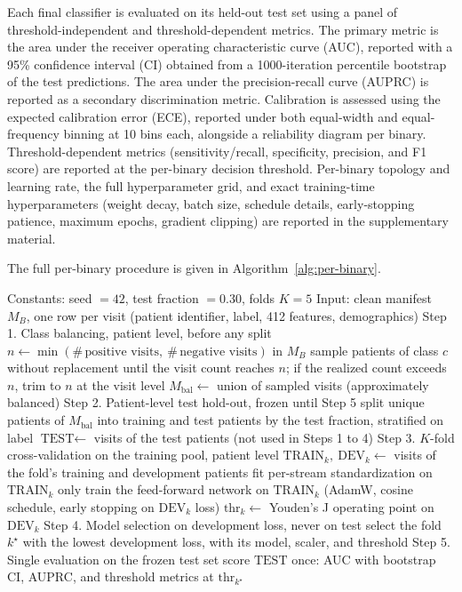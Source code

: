 \documentclass[utf8]{FrontiersinHarvard} %
\begin{document}
Each final classifier is evaluated on its held-out test set using a panel of threshold-independent and threshold-dependent metrics. The primary metric is the area under the receiver operating characteristic curve (AUC), reported with a 95\% confidence interval (CI) obtained from a 1000-iteration percentile bootstrap of the test predictions. The area under the precision-recall curve (AUPRC) is reported as a secondary discrimination metric. Calibration is assessed using the expected calibration error (ECE), reported under both equal-width and equal-frequency binning at 10 bins each, alongside a reliability diagram per binary. Threshold-dependent metrics (sensitivity/recall, specificity, precision, and F1 score) are reported at the per-binary decision threshold. Per-binary topology and learning rate, the full hyperparameter grid, and exact training-time hyperparameters (weight decay, batch size, schedule details, early-stopping patience, maximum epochs, gradient clipping) are reported in the supplementary material.

The full per-binary procedure is given in Algorithm~\ref{alg:per-binary}.

\begin{algorithm}[htbp]
\caption{Per-binary preparation, training, and evaluation (binary $B$).}
\label{alg:per-binary}
\begin{algorithmic}[1]
\State Constants: seed $=42$, test fraction $=0.30$, folds $K=5$
\State Input: clean manifest $M_B$, one row per visit (patient identifier, label, 412 features, demographics)
\Statex
\State Step 1. Class balancing, patient level, before any split
\State $n \gets \min(\#\,\text{positive visits},\ \#\,\text{negative visits})$ in $M_B$
  \State sample patients of class $c$ without replacement until the visit count reaches $n$; if the realized count exceeds $n$, trim to $n$ at the visit level
\EndFor
\State $M_{\text{bal}} \gets$ union of sampled visits (approximately balanced)
\Statex
\State Step 2. Patient-level test hold-out, frozen until Step 5
\State split unique patients of $M_{\text{bal}}$ into training and test patients by the test fraction, stratified on label
\State $\text{TEST} \gets$ visits of the test patients (not used in Steps 1 to 4)
\Statex
\State Step 3. $K$-fold cross-validation on the training pool, patient level
  \State $\text{TRAIN}_k,\ \text{DEV}_k \gets$ visits of the fold's training and development patients
  \State fit per-stream standardization on $\text{TRAIN}_k$ only
  \State train the feed-forward network on $\text{TRAIN}_k$ (AdamW, cosine schedule, early stopping on $\text{DEV}_k$ loss)
  \State $\text{thr}_k \gets$ Youden's J operating point on $\text{DEV}_k$
\EndFor
\Statex
\State Step 4. Model selection on development loss, never on test
\State select the fold $k^\star$ with the lowest development loss, with its model, scaler, and threshold
\Statex
\State Step 5. Single evaluation on the frozen test set
\State score $\text{TEST}$ once: AUC with bootstrap CI, AUPRC, and threshold metrics at $\text{thr}_{k^\star}$
\end{algorithmic}
\end{algorithm}
\end{document}
